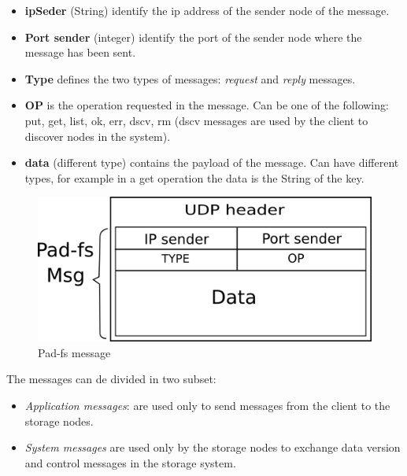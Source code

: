 \begin{itemize}
\item \textbf{ipSeder} (String) identify the ip address of the sender node of the message. 
\item \textbf{Port sender} (integer) identify the port of the sender node where the message has been sent.
\item \textbf{Type} defines the two types of messages: \textit{request} and \textit{reply} messages.
\item \textbf{OP} is the operation requested in the message. Can be one of the following: put, get, list, ok, err, dscv, rm (dscv messages are used by the client to discover nodes in the system).
\item \textbf{data} (different type) contains the payload of the message.  Can have different types, for example in a get operation the data is the String of the key.
\end{itemize}


\begin{figure}[H]
\centering
\includegraphics[scale=0.5]{figures/messages.png}
\caption{Pad-fs message}
\label{fig:msg}
\end{figure}


The messages can de divided in two subset:
\begin{itemize}
\item \textit{Application messages}: are used only to send messages from the client to the storage nodes.
\item \textit{System messages} are used only by the storage nodes  to exchange data version and control messages in the storage system.
\end{itemize}
